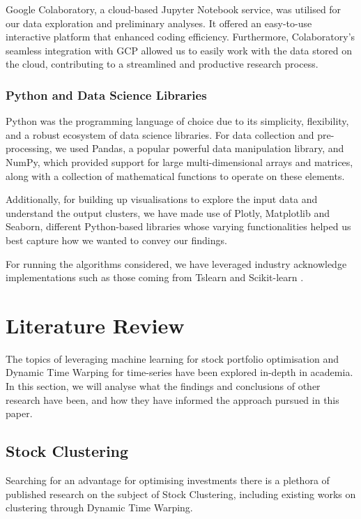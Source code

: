 \documentclass[11pt]{article}
\begin{document}
Google Colaboratory, a cloud-based Jupyter Notebook service, was utilised for our data exploration and preliminary analyses. It offered an easy-to-use interactive platform that enhanced coding efficiency. Furthermore, Colaboratory's seamless integration with GCP allowed us to easily work with the data stored on the cloud, contributing to a streamlined and productive research process.

\subsubsection{Python and Data Science Libraries}

Python was the programming language of choice due to its simplicity, flexibility, and a robust ecosystem of data science libraries. For data collection and pre-processing, we used Pandas, a popular powerful data manipulation library, and NumPy, which provided support for large multi-dimensional arrays and matrices, along with a collection of mathematical functions to operate on these elements. 

Additionally, for building up visualisations to explore the input data and understand the output clusters, we have made use of Plotly, Matplotlib and Seaborn, different Python-based libraries whose varying functionalities helped us best capture how we wanted to convey our findings.

For running the algorithms considered, we have leveraged industry acknowledge implementations such as those coming from Tslearn \cite{tslearn} and Scikit-learn \cite{scikit}.

\section{Literature Review}
\label{sec:literature_review}

The topics of leveraging machine learning for stock portfolio optimisation and Dynamic Time Warping for time-series have been explored in-depth in academia. In this section, we will analyse what the findings and conclusions of other research have been, and how they have informed the approach pursued in this paper.

\subsection{Stock Clustering}

Searching for an advantage for optimising investments there is a plethora of published research on the subject of Stock Clustering, including existing works on clustering through Dynamic Time Warping.
\end{document}
